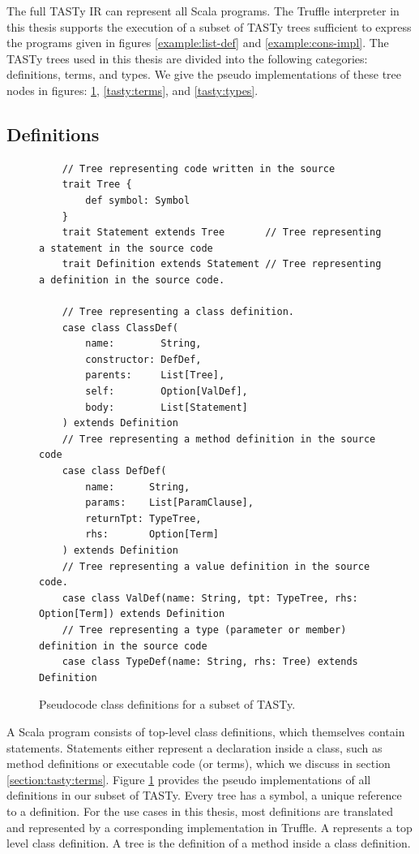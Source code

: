The full TASTy IR can represent all Scala programs.
The Truffle interpreter in this thesis supports the execution of a subset of TASTy trees sufficient to express the programs given in figures \ref{example:list-def} and \ref{example:cons-impl}.
The TASTy trees used in this thesis are divided into the following categories: definitions, terms, and types. 
We give the pseudo implementations of these tree nodes in figures: \ref{tasty:defs}, \ref{tasty:terms}, and \ref{tasty:types}.

\subsection{Definitions}

\begin{figure}[!htb]
	\begin{verbatim}
	// Tree representing code written in the source
	trait Tree {
		def symbol: Symbol
	}                         
	trait Statement extends Tree       // Tree representing a statement in the source code
	trait Definition extends Statement // Tree representing a definition in the source code.
		
	// Tree representing a class definition.
	case class ClassDef(
		name:        String,
		constructor: DefDef, 
		parents:     List[Tree], 
		self:        Option[ValDef], 
		body:        List[Statement]
	) extends Definition
	// Tree representing a method definition in the source code
	case class DefDef(
		name:      String, 
		params:    List[ParamClause], 
		returnTpt: TypeTree, 
		rhs:       Option[Term]
	) extends Definition
	// Tree representing a value definition in the source code.
	case class ValDef(name: String, tpt: TypeTree, rhs: Option[Term]) extends Definition
	// Tree representing a type (parameter or member) definition in the source code
	case class TypeDef(name: String, rhs: Tree) extends Definition
	\end{verbatim} 
	\caption{Pseudocode class definitions for a subset of TASTy.}
	\label{tasty:defs}
\end{figure}

A Scala program consists of top-level class definitions, which themselves contain statements.
Statements either represent a declaration inside a class, such as method definitions or executable code (or terms), which we discuss in section \ref{section:tasty:terms}.
Figure \ref{tasty:defs} provides the pseudo implementations of all definitions in our subset of TASTy.
Every tree has a symbol, a unique reference to a definition.
For the use cases in this thesis, most definitions are translated and represented by a corresponding implementation in Truffle.
A  represents a top level class definition.
A  tree is the definition of a method inside a class definition.

